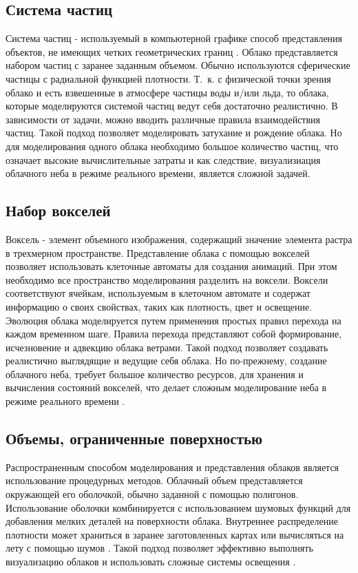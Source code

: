 \subsection{Система частиц}
\label{particles}
Система частиц - используемый в компьютерной графике способ представления объектов, не имеющих четких геометрических границ \cite{particles1}. 
Облако представляется набором частиц с заранее заданным объемом. Обычно используются сферические частицы с радиальной функцией плотности. Т.~к. с физической точки зрения облако и есть взвешенные в атмосфере частицы воды и/или льда, то 
облака, которые моделируются системой частиц ведут себя достаточно реалистично. В зависимости от задачи, можно вводить различные правила взаимодействия частиц.
Такой подход позволяет моделировать затухание и рождение облака. Но для моделирования одного облака необходимо большое количество частиц, что означает высокие вычислительные затраты и как следствие, визуализиация облачного неба в режиме реального времени, является сложной задачей.  

\subsection{Набор вокселей} 

Воксель - элемент объемного изображения, содержащий значение элемента растра в трехмерном пространстве.
Представление облака с помощью вокселей позволяет использовать клеточные автоматы для создания анимаций. При этом необходимо все пространство моделирования разделить на воксели. Воксели
соответствуют ячейкам, используемым в клеточном автомате и содержат информацию о своих свойствах, таких как плотность, цвет и освещение. Эволюция облака моделируется путем
применения простых правил перехода на каждом временном шаге. Правила перехода представляют собой формирование, исчезновение и адвекцию облака ветрами.
Такой подход позволяет создавать реалистично выглядящие и ведущие себя облака. Но по-прежнему, создание облачного неба, требует большое количество ресурсов, для хранения и вычисления состояний вокселей, что делает сложным моделирование неба в режиме реального времени \cite{voxel}.

\subsection{Объемы, ограниченные поверхностью} 
\label{partmediaref}
Распространенным способом моделирования и представления облаков является использование процедурных методов. Облачный объем представляется окружающей его оболочкой, обычно заданной с помощью полигонов. Использование оболочки комбинируется с использованием шумовых функций для добавления мелких деталей на поверхности облака. Внутреннее распределение плотности может храниться в заранее заготовленных картах или вычисляться на лету с помощью шумов \cite{frostbite}. Такой подход позволяет эффективно выполнять визуализацию облаков и использовать сложные системы освещения \cite{clouds}. 


